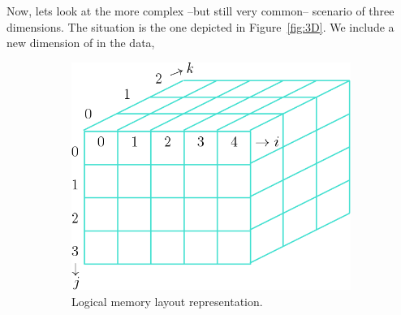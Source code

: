 Now, lets look at the more complex --but still very common-- scenario of three dimensions. The situation is the one depicted in Figure~\ref{fig:3D}. We include a new dimension of in the data,

\begin{figure}[htp]
  \centering
  \begin{subfigure}[b]{0.35\textwidth}
    \includegraphics[width=\textwidth]{img/array3D}
    \caption{Logical memory layout representation.}
  \label{fig:3a}
  \end{subfigure}
  \hspace*{4cm}
  \begin{subfigure}[b]{0.2\textwidth}

\end{subfigure}
\end{figure}
